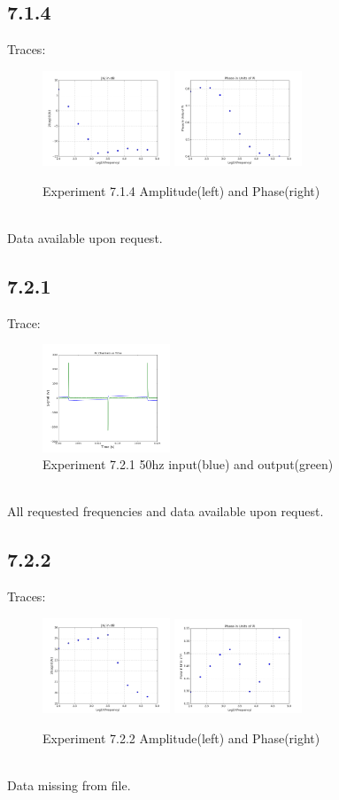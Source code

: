 \documentclass[a4paper,12pt]{article}
\begin{document}
\subsection*{7.1.4}
Traces:
\begin{figure}[h]
\centering
\includegraphics[width=1.5in]{7.1.4/lab7_1_4_Amplitude.png}
\includegraphics[width=1.5in]{7.1.4/lab7_1_4_Phase.png}
\caption{Experiment 7.1.4 Amplitude(left) and Phase(right)}
\end{figure}\\
Data available upon request.
\newpage
\subsection*{7.2.1}
Trace:
\begin{figure}[h]
\centering
\includegraphics[width=1.5in]{7.2.1/lab7_2_1_50hz_ch1_ch2.png}
\caption{Experiment 7.2.1 50hz input(blue) and output(green)}
\end{figure}\\
All requested frequencies and data available upon request.

\subsection*{7.2.2}
Traces:
\begin{figure}[h]
\centering
\includegraphics[width=1.5in]{7.2.2/lab7_2_2_Amplitude.png}
\includegraphics[width=1.5in]{7.2.2/lab7_2_2_Phase.png}
\caption{Experiment 7.2.2 Amplitude(left) and Phase(right)}
\end{figure}\\
Data missing from file.
\end{document}
